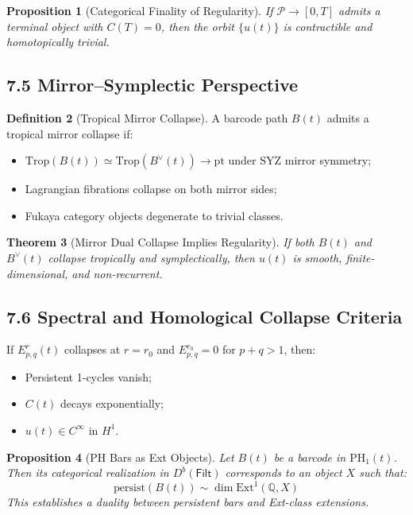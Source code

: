 \documentclass[11pt]{article}
\newtheorem{theorem}{Theorem}[section]
\newtheorem{proposition}[theorem]{Proposition}
\theoremstyle{definition}
\newtheorem{definition}[theorem]{Definition}
\begin{document}
\begin{proposition}[Categorical Finality of Regularity]
If $\mathcal{P} \to [0,T]$ admits a terminal object with $C(T) = 0$, then the orbit $\{ u(t) \}$ is contractible and homotopically trivial.
\end{proposition}

\subsection*{7.5 Mirror--Symplectic Perspective}

\begin{definition}[Tropical Mirror Collapse]
A barcode path $B(t)$ admits a tropical mirror collapse if:
\begin{itemize}
  \item $\mathrm{Trop}(B(t)) \simeq \mathrm{Trop}(B^\vee(t)) \to \mathrm{pt}$ under SYZ mirror symmetry;
  \item Lagrangian fibrations collapse on both mirror sides;
  \item Fukaya category objects degenerate to trivial classes.
\end{itemize}
\end{definition}

\begin{theorem}[Mirror Dual Collapse Implies Regularity]
If both $B(t)$ and $B^\vee(t)$ collapse tropically and symplectically, then $u(t)$ is smooth, finite-dimensional, and non-recurrent.
\end{theorem}

\subsection*{7.6 Spectral and Homological Collapse Criteria}

If $E^r_{p,q}(t)$ collapses at $r = r_0$ and $E^{r_0}_{p,q}=0$ for $p+q>1$, then:
\begin{itemize}
  \item Persistent 1-cycles vanish;
  \item $C(t)$ decays exponentially;
  \item $u(t) \in C^\infty$ in $H^1$.
\end{itemize}

\begin{proposition}[PH Bars as Ext Objects]
Let $B(t)$ be a barcode in $\mathrm{PH}_1(t)$. Then its categorical realization in $D^b(\mathsf{Filt})$ corresponds to an object $X$ such that:
\[
\text{persist}(B(t)) \sim \dim \mathrm{Ext}^1(\mathbb{Q}, X)
\]
This establishes a duality between persistent bars and Ext-class extensions.
\end{proposition}
\end{document}

